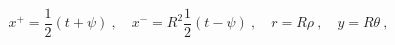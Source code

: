 \begin{equation}
 x^+ = \frac12 (t+ \psi) ~,\quad
 x^- = R^2 \frac12 (t-\psi) ~,\quad
 r = R \rho ~,\quad y = R \theta ~,
\label{AdS2pp}
\end{equation}

